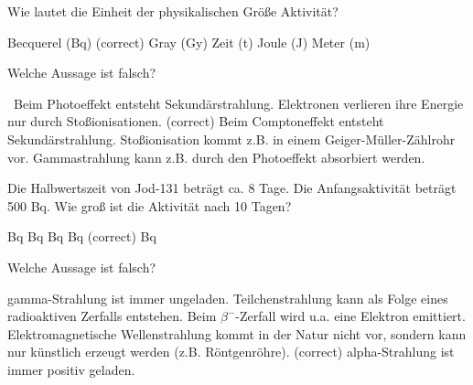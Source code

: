 \documentclass[11pt]{exam}
\begin{document}
\setlength{\voffset}{-0.5in}
\setlength{\headsep}{5pt}

\hspace{2mm}
 \hspace{5mm}
\vspace{4mm}

\begin{questions}

\question Wie lautet die Einheit der physikalischen Größe Aktivität?

\begin{choices}
	\choice Becquerel (Bq) (correct)
	\choice Gray (Gy)
	\choice Zeit (t)
	\choice Joule (J)
	\choice Meter (m)
\end{choices}

\vspace{3mm}\question Welche Aussage ist falsch?

\begin{choices}
	\choice  Beim Photoeffekt entsteht Sekundärstrahlung.
	\choice Elektronen verlieren ihre Energie nur durch Stoßionisationen. (correct)
	\choice Beim Comptoneffekt entsteht Sekundärstrahlung.
	\choice Stoßionisation kommt z.B. in einem Geiger-Müller-Zählrohr vor.
	\choice Gammastrahlung kann z.B. durch den Photoeffekt absorbiert werden.
\end{choices}

\vspace{3mm}\question Die Halbwertszeit von Jod-131 beträgt ca. 8 Tage. Die Anfangsaktivität beträgt 500 Bq. Wie groß ist die Aktivität nach 10 Tagen?

\begin{choices}
	 Bq
	 Bq
	 Bq
	 Bq (correct)
	 Bq
\end{choices}

\vspace{3mm}\question Welche Aussage ist falsch?

\begin{choices}
	\choice gamma-Strahlung ist immer ungeladen.
	\choice Teilchenstrahlung kann als Folge eines radioaktiven Zerfalls entstehen.
	\choice Beim \( \beta^- \)-Zerfall wird u.a. eine Elektron emittiert.
	\choice Elektromagnetische Wellenstrahlung kommt in der Natur nicht vor, sondern kann nur künstlich erzeugt werden (z.B. Röntgenröhre). (correct)
	\choice alpha-Strahlung ist immer positiv geladen.
\end{choices}


\end{questions}
\end{document}
